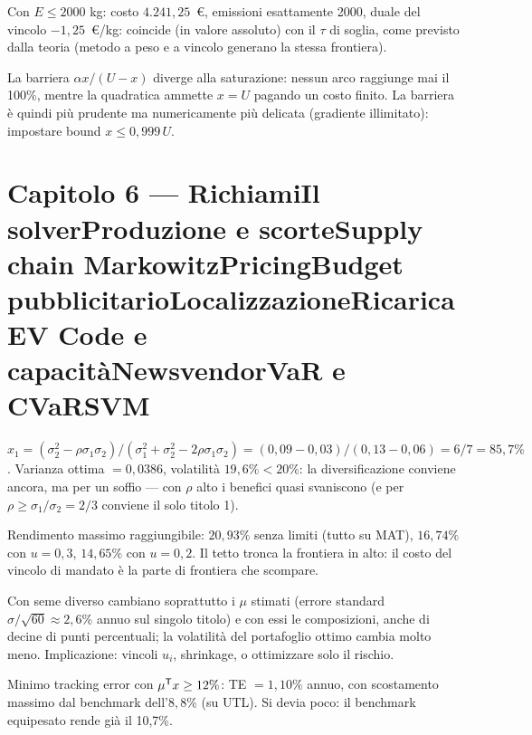 \documentclass[11pt,a4paper]{article}
\newcounter{cap}
\newcounter{sol}[cap]
\newcommand{\capitolo}[1]{\setcounter{cap}{#1}\section*{Capitolo #1 --- \capnome{#1}}}
\newcommand{\capnome}[1]{%
  \ifcase#1\or\or Richiami\or Il solver\or Produzione e scorte\or Supply chain\or
  Markowitz\or Pricing\or Budget pubblicitario\or Localizzazione\or Ricarica EV\or
  Code e capacità\or Newsvendor\or VaR e CVaR\or SVM\fi}
\begin{document}
\begin{soluzione}
Con $E \le 2000$ kg: costo $4.241{,}25$~\euro, emissioni esattamente 2000, duale del
vincolo $-1{,}25$~\euro/kg: coincide (in valore assoluto) con il $\tau$ di soglia,
come previsto dalla teoria (metodo a peso e a vincolo generano la stessa frontiera).
\end{soluzione}

\begin{soluzione}[barriera]
La barriera $\alpha x/(U - x)$ diverge alla saturazione: nessun arco raggiunge mai il
100\%, mentre la quadratica ammette $x = U$ pagando un costo finito. La barriera è
quindi più prudente ma numericamente più delicata (gradiente illimitato): impostare
bound $x \le 0{,}999\,U$.
\end{soluzione}

\capitolo{6}

\begin{soluzione}[verifica]
$x_1 = (\sigma_2^2 - \rho\sigma_1\sigma_2)/(\sigma_1^2 + \sigma_2^2
- 2\rho\sigma_1\sigma_2) = (0{,}09 - 0{,}03)/(0{,}13 - 0{,}06) = 6/7 = 85{,}7\%$.
Varianza ottima $= 0{,}0386$, volatilità $19{,}6\% < 20\%$: la diversificazione
conviene ancora, ma per un soffio --- con $\rho$ alto i benefici quasi svaniscono
(e per $\rho \ge \sigma_1/\sigma_2 = 2/3$ conviene il solo titolo 1).
\end{soluzione}

\begin{soluzione}[frontiera]
Rendimento massimo raggiungibile: $20{,}93\%$ senza limiti (tutto su MAT),
$16{,}74\%$ con $u = 0{,}3$, $14{,}65\%$ con $u = 0{,}2$. Il tetto tronca la
frontiera in alto: il costo del vincolo di mandato è la parte di frontiera che
scompare.
\end{soluzione}

\begin{soluzione}[stabilità]
Con seme diverso cambiano soprattutto i $\mu$ stimati (errore standard
$\sigma/\sqrt{60} \approx 2{,}6\%$ annuo sul singolo titolo) e con essi le
composizioni, anche di decine di punti percentuali; la volatilità del portafoglio
ottimo cambia molto meno. Implicazione: vincoli $u_i$, shrinkage, o ottimizzare solo
il rischio.
\end{soluzione}

\begin{soluzione}
Minimo tracking error con $\mu^{\mathsf T} x \ge 12\%$: TE $= 1{,}10\%$ annuo, con scostamento
massimo dal benchmark dell'$8{,}8\%$ (su UTL). Si devia poco: il benchmark equipesato
rende già il 10{,}7\%.
\end{soluzione}
\end{document}
